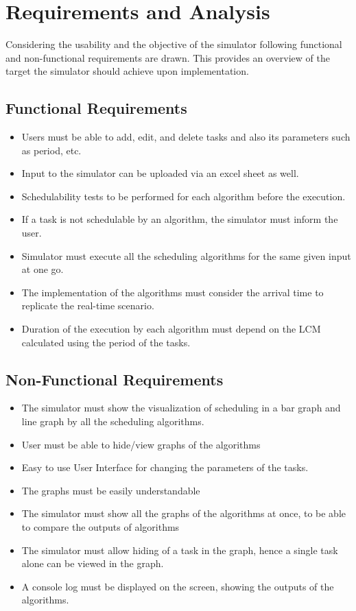 \documentclass[12pt, conference]{IEEEtran}
\begin{document}
\section{Requirements and Analysis}
Considering the usability and the objective of the simulator following functional and non-functional requirements are drawn. This provides an overview of the target the simulator should achieve upon implementation.
\subsection{Functional Requirements}
\begin{itemize}
    \item Users must be able to add, edit, and delete tasks and also its parameters such as period, etc.
    \item Input to the simulator can be uploaded via an excel sheet as well.
    \item Schedulability tests to be performed for each algorithm before the execution.
    \item If a task is not schedulable by an algorithm, the simulator must inform the user.
    \item Simulator must execute all the scheduling algorithms for the same given input at one go.
    \item The implementation of the algorithms must consider the arrival time to replicate the real-time scenario.
    \item Duration of the execution by each algorithm must depend on the LCM calculated using the period of the tasks.
\end{itemize}
\subsection{Non-Functional Requirements}
\begin{itemize}
    \item The simulator must show the visualization of scheduling in a bar graph and line graph by all the scheduling algorithms.
    \item User must be able to hide/view graphs of the algorithms
    \item Easy to use User Interface for changing the parameters of the tasks.
    \item The graphs must be easily understandable
    \item The simulator must show all the graphs of the algorithms at once, to be able to compare the outputs of algorithms
    \item The simulator must allow hiding of a task in the graph, hence a single task alone can be viewed in the graph.
    \item A console log must be displayed on the screen, showing the outputs of the algorithms.
\end{itemize}
\end{document}
